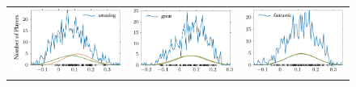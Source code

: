\documentclass[10pt, a4paper]{UUThesisTemplate}
\begin{document}
\begin{figure}
\begin{tabular}{c c c}
\hspace{-2cm}\includegraphics{figures/amazing_distribution.pdf} & \includegraphics{figures/great_distribution.pdf} & \includegraphics{figures/fantastic_distribution.pdf}\\

\end{tabular}
\end{figure}
\end{document}
